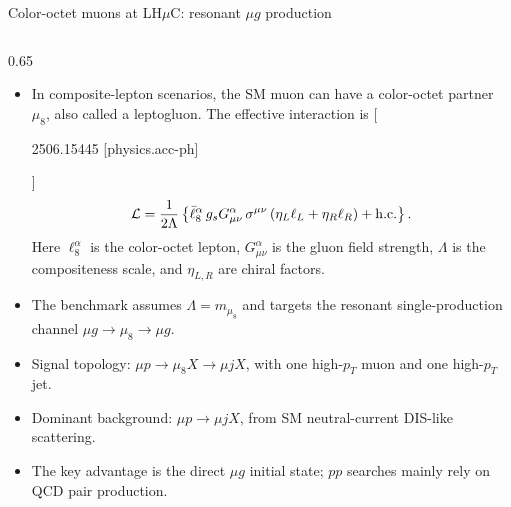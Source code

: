 \documentclass[aspectratio=1610,english]{beamer}
\newcommand{\LHCmu}{LH$\mu$C}
\begin{document}
\begin{frame}{Color-octet muons at \texorpdfstring{\LHCmu{}}{LHmuC}: resonant \(\mu g\) production}
	
\vspace{-0.25em}
	
\begin{columns}[T]%
	
\begin{column}{0.65\textwidth}
			
\begin{itemize}
\scriptsize
\justifying
\item In composite-lepton scenarios, the SM muon can have a color-octet partner
\(\mu_8\), also called a leptogluon.  The effective interaction is 
[{\centering
\tiny
{\setlength{\fboxsep}{4pt}\colorbox{magenta!10}{\strut2506.15445 [physics.acc-ph]}}}]
				\[
				\mathcal{L}
				=
				\frac{1}{2\Lambda}
				\left\{
				\bar{\ell}^{\alpha}_{8}\,
				g_s G^{\alpha}_{\mu\nu}\,
				\sigma^{\mu\nu}
				\left(\eta_L \ell_L+\eta_R \ell_R\right)
				+{\rm h.c.}
				\right\}.
				\]
Here \(\ell^\alpha_8\) is the color-octet lepton, \(G^\alpha_{\mu\nu}\) is the gluon field strength, \(\Lambda\) is the compositeness scale, and
\(\eta_{L,R}\) are chiral factors.
\end{itemize}
			
\vspace{0.15em}
			
\begin{itemize}
\scriptsize
\justifying
\item The benchmark assumes \(\Lambda=m_{\mu_8}\) and targets the resonant
single-production channel  $\mu g\to\mu_8\to\mu g$.
				
\item Signal topology: $\mu p\to \mu_8 X\to \mu j X$, with one high-\(p_T\) muon and one high-\(p_T\) jet.
				
\item Dominant background: $\mu p\to \mu j X$, from SM neutral-current DIS-like scattering.
	
\item The key advantage is the direct \(\mu g\) initial state; \(pp\) searches mainly rely on QCD pair production.
\end{itemize}
			

\end{column}
\end{columns}
\end{frame}
\end{document}
